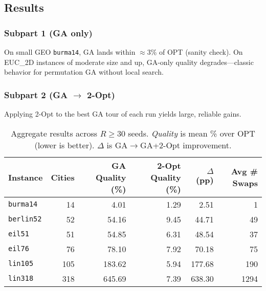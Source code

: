 \documentclass{article}
\begin{document}
\subsection{Results}
\subsubsection*{Subpart 1 (GA only)}
On small GEO \texttt{burma14}, GA lands within $\approx$3\% of OPT (sanity check). On EUC\_2D instances of moderate size and up, GA-only quality degrades---classic behavior for permutation GA without local search.

\subsubsection*{Subpart 2 (GA $\rightarrow$ 2-Opt)}
Applying 2-Opt to the best GA tour of each run yields large, reliable gains.
\begin{table}[H]
\centering
\begin{tabular}{lrrrrr}
\toprule
Instance & Cities & GA Quality (\%) & 2-Opt Quality (\%) & $\Delta$ (pp) & Avg \# Swaps \\
\midrule
\texttt{burma14}  & 14  & 4.01  & 1.29  & 2.51  & 1 \\
\texttt{berlin52} & 52  & 54.16 & 9.45  & 44.71 & 49 \\
\texttt{eil51}    & 51  & 54.85 & 6.31  & 48.54 & 37 \\
\texttt{eil76}    & 76  & 78.10 & 7.92  & 70.18 & 75 \\
\texttt{lin105}   & 105 & 183.62 & 5.94 & 177.68 & 190 \\
\texttt{lin318}   & 318 & 645.69 & 7.39 & 638.30 & 1294 \\
\bottomrule
\end{tabular}
\caption{Aggregate results across $R\ge 30$ seeds. \emph{Quality} is mean \% over OPT (lower is better). $\Delta$ is GA$\to$GA+2-Opt improvement.}
\label{tab:tsp_results}
\end{table}
\end{document}
